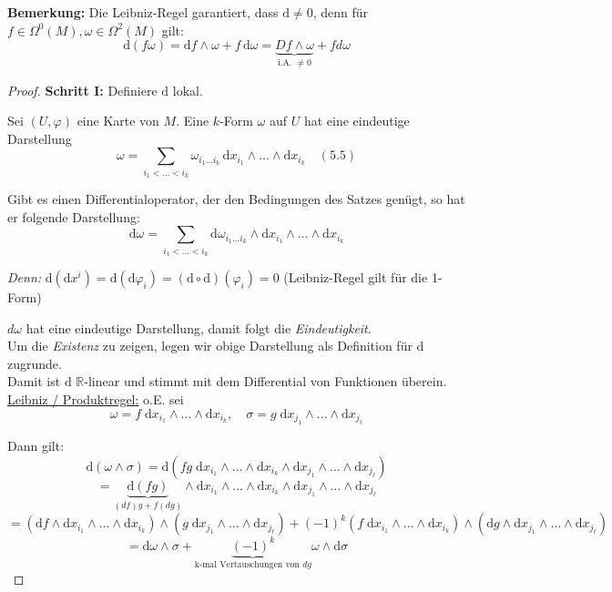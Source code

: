\documentclass[fleqn, 12pt, letterpaper]{article}
\newcommand{\txt}[1]{\text{#1}}
\begin{document}
\textbf{Bemerkung:} Die Leibniz-Regel garantiert, dass \( \mathrm{d} \neq 0 \), denn für \( f \in \Omega^0(M), \omega \in \Omega^2(M) \) gilt:
\[
\mathrm{d}(f\omega) = \mathrm{d}f \wedge \omega + f \, \mathrm{d}\omega = \underbrace{Df\wedge \omega}_{\txt{i.A. }\neq 0} + fd\omega
\]
\begin{proof}
\quad

\textbf{Schritt I:} Definiere \( \mathrm{d} \) lokal.

Sei \( (U, \varphi) \) eine Karte von \( M \). Eine \( k \)-Form \( \omega \) auf \( U \) hat eine eindeutige Darstellung
\[
\omega = \sum_{i_1 < \dots < i_k} \omega_{i_1 \dots i_k} \, \mathrm{d}x_{i_1} \wedge \dots \wedge \mathrm{d}x_{i_k} \quad (5.5)
\]

Gibt es einen Differentialoperator, der den Bedingungen des Satzes genügt, so hat er folgende Darstellung:
\[
\mathrm{d}\omega = \sum_{i_1 < \dots < i_k} \mathrm{d} \omega_{i_1 \dots i_k} \wedge \mathrm{d}x_{i_1} \wedge \dots \wedge \mathrm{d}x_{i_k}
\]

\textit{Denn:} \( \mathrm{d}(\mathrm{d}x^i) = \mathrm{d}(\mathrm{d} \varphi_i) = (\mathrm{d} \circ \mathrm{d})(\varphi_i) = 0 \) (Leibniz-Regel gilt für die 1-Form)

$d\omega$ hat eine eindeutige Darstellung, damit folgt die \emph{Eindeutigkeit}.\\

Um die \emph{Existenz} zu zeigen, legen wir obige Darstellung als Definition für \( \mathrm{d} \) zugrunde. \\
Damit ist \( \mathrm{d} \) \( \mathbb{R} \)-linear und stimmt mit dem Differential von Funktionen überein.\\

\underline{Leibniz / Produktregel:}
o.E. sei 
\[
\omega = f\;\mathrm{d}x_{i_1} \wedge \dots \wedge \mathrm{d}x_{i_k}, \quad 
\sigma = g\;\mathrm{d}x_{j_1} \wedge \dots \wedge \mathrm{d}x_{j_\ell}
\]

Dann gilt:
\[\mathrm{d}(\omega \wedge \sigma) = \mathrm{d}\left(fg\; \mathrm{d}x_{i_1} \wedge \dots \wedge \mathrm{d}x_{i_k} \wedge \mathrm{d}x_{j_1} \wedge \dots \wedge \mathrm{d}x_{j_\ell} \right) \]
\[= \underbrace{\mathrm{d}(fg)}_{(df)g+f(dg)} \wedge \mathrm{d}x_{i_1} \wedge \dots \wedge \mathrm{d}x_{i_k} \wedge \mathrm{d}x_{j_1} \wedge \dots \wedge \mathrm{d}x_{j_\ell}\]
\[=(\mathrm{d}f\wedge \mathrm{d}x_{i_1} \wedge \dots \wedge \mathrm{d}x_{i_k})\wedge (g\;\mathrm{d}x_{j_1} \wedge \dots \wedge \mathrm{d}x_{j_\ell}) +(-1)^k (f\; \mathrm{d}x_{i_1} \wedge \dots \wedge \mathrm{d}x_{i_k})\wedge (\mathrm{d}g\wedge\mathrm{d}x_{j_1} \wedge \dots \wedge \mathrm{d}x_{j_\ell})\]
\[= \mathrm{d}\omega \wedge \sigma + \underbrace{(-1)^k}_{\txt{k-mal Vertauschungen von }dg} \omega \wedge \mathrm{d}\sigma\]


\end{proof}
\end{document}
